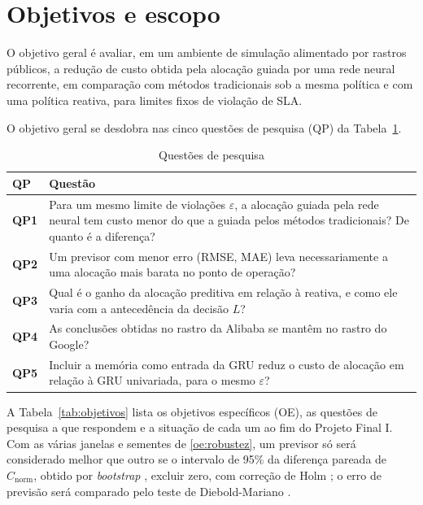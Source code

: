 \section{Objetivos e escopo}
\label{sec:objetivos}
\label{subsec:objetivo-geral}
\label{subsec:questoes}
\label{subsec:objetivos-especificos}

O objetivo geral é avaliar, em um ambiente de simulação alimentado por rastros públicos, a redução de custo obtida pela alocação guiada por uma rede neural recorrente, em comparação com métodos tradicionais sob a mesma política e com uma política reativa, para limites fixos de violação de SLA.

O objetivo geral se desdobra nas cinco questões de pesquisa (QP) da Tabela~\ref{tab:questoes}.

\begin{table}[htbp]
\centering
\caption{Questões de pesquisa}
\label{tab:questoes}
\renewcommand{\arraystretch}{1.5}
\footnotesize
\begin{tabularx}{\textwidth}{>{\raggedright\arraybackslash}p{0.9cm} >{\raggedright\arraybackslash}X}
\toprule
\textbf{QP} & \textbf{Questão} \\
\midrule
\textbf{QP1} & Para um mesmo limite de violações $\varepsilon$, a alocação guiada pela rede neural tem custo menor do que a guiada pelos métodos tradicionais? De quanto é a diferença? \\
\textbf{QP2} & Um previsor com menor erro (RMSE, MAE) leva necessariamente a uma alocação mais barata no ponto de operação? \\
\textbf{QP3} & Qual é o ganho da alocação preditiva em relação à reativa, e como ele varia com a antecedência da decisão $L$? \\
\textbf{QP4} & As conclusões obtidas no rastro da Alibaba se mantêm no rastro do Google? \\
\textbf{QP5} & Incluir a memória como entrada da GRU reduz o custo de alocação em relação à GRU univariada, para o mesmo $\varepsilon$? \\
\bottomrule
\end{tabularx}
\end{table}

A Tabela~\ref{tab:objetivos} lista os objetivos específicos (OE), as questões de pesquisa a que respondem e a situação de cada um ao fim do Projeto Final I. Com as várias janelas e sementes de \ref{oe:robustez}, um previsor só será considerado melhor que outro se o intervalo de 95\% da diferença pareada de $C_{\mathrm{norm}}$, obtido por \textit{bootstrap} \cite{efron1993introduction}, excluir zero, com correção de Holm \cite{holm1979simple}; o erro de previsão será comparado pelo teste de Diebold-Mariano \cite{diebold1995comparing}.

